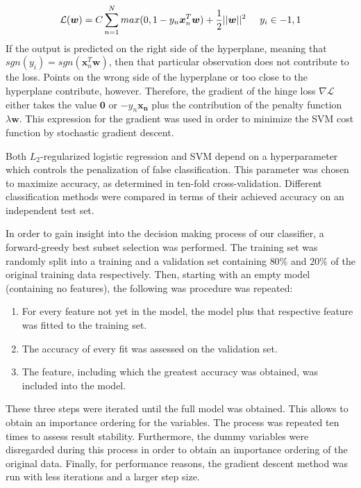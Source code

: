 \documentclass[10pt,conference,compsocconf]{IEEEtran}
\begin{document}
\begin{equation}
\mathcal{L}(\boldsymbol{w}) = C \sum_{n=1}^N max(0,1-y_n \boldsymbol{x}_n^T\boldsymbol{w}) + \frac{1}{2}||\boldsymbol{w}||^2 \hspace{5mm} y_i \in {-1,1}
\end{equation}  
If the output is predicted on the right side of the hyperplane, meaning that $sgn(y_i) = sgn(\boldsymbol{x}_n^T\boldsymbol{w})$, then that particular observation does not contribute to the loss. Points on the wrong side of the hyperplane or too close to the hyperplane contribute, however. Therefore, the gradient of the hinge loss $\nabla \mathcal{L}$ either takes the value $\boldsymbol{0}$ or $-y_n\boldsymbol{x_n}$ plus the contribution of the penalty function $\lambda \boldsymbol{w}$. This expression for the gradient was used in order to minimize the SVM cost function by stochastic gradient descent.
\par
Both $L_2$-regularized logistic regression and SVM depend on a hyperparameter which controls the penalization of false classification. This parameter was chosen to maximize accuracy, as determined in ten-fold cross-validation. Different classification methods were compared in terms of their achieved accuracy on an independent test set. %
\par
In order to gain insight into the decision making process of our classifier, a forward-greedy best subset selection was performed. The training set was randomly split into a training and a validation set containing $80\%$ and $20\%$ of the original training data respectively. Then, starting with an empty model (containing no features), the following was procedure was repeated: 
\begin{enumerate}
	\item For every feature not yet in the model, the model plus that respective feature was fitted to the training set.
	\item The accuracy of every fit was assessed on the validation set.  
	\item The feature, including which the greatest accuracy was obtained, was included into the model.
\end{enumerate}
These three steps were iterated until the full model was obtained. This allows to obtain an importance ordering for the variables. The process was repeated ten times to assess result stability. Furthermore, the dummy variables were disregarded during this process in order to obtain an importance ordering of the original data. Finally, for performance reasons, the gradient descent method was run with less iterations and a larger step size.
\end{document}
